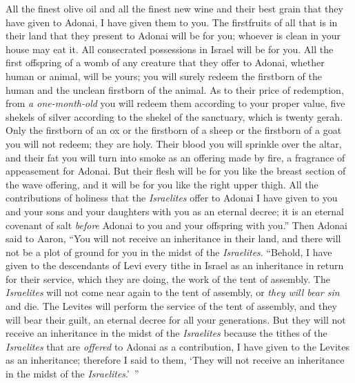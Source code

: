 \begin{biblechapter}
\verse All the finest olive oil and all the finest new wine and their best grain that they have given to Adonai, I have given them to you.
\verse The firstfruits of all that is in their land that they present to Adonai will be for you; whoever is clean in your house may eat it.
\verse All consecrated possessions in Israel will be for you.
\verse All the first offspring of a womb of any creature that they offer to Adonai, whether human or animal, will be yours; you will surely redeem the firstborn of the human and the unclean firstborn of the animal.
\verse As to their price of redemption, from \textit{a one-month-old} you will redeem them according to your proper value, five shekels of silver according to the shekel of the sanctuary, which is twenty gerah.
\verse Only the firstborn of an ox or the firstborn of a sheep or the firstborn of a goat you will not redeem; they are holy. Their blood you will sprinkle over the altar, and their fat you will turn into smoke as an offering made by fire, a fragrance of appeasement for Adonai.
\verse But their flesh will be for you like the breast section of the wave offering, and it will be for you like the right upper thigh.
\verse All the contributions of holiness that the \textit{Israelites} offer to Adonai I have given to you and your sons and your daughters with you as an eternal decree; it is an eternal covenant of salt \textit{before} Adonai to you and your offspring with you.”
\verse Then Adonai said to Aaron, “You will not receive an inheritance in their land, and there will not be a plot of ground for you in the midst of the \textit{Israelites}.
\verse “Behold, I have given to the descendants of Levi every tithe in Israel as an inheritance in return for their service, which they are doing, the work of the tent of assembly.
\verse The \textit{Israelites} will not come near again to the tent of assembly, or \textit{they will bear sin} and die.
\verse The Levites will perform the service of the tent of assembly, and they will bear their guilt, an eternal decree for all your generations. But they will not receive an inheritance in the midst of the \textit{Israelites}
\verse because the tithes of the \textit{Israelites} that are \textit{offered} to Adonai as a contribution, I have given to the Levites as an inheritance; therefore I said to them, ‘They will not receive an inheritance in the midst of the \textit{Israelites}.’ ”

\end{biblechapter}
